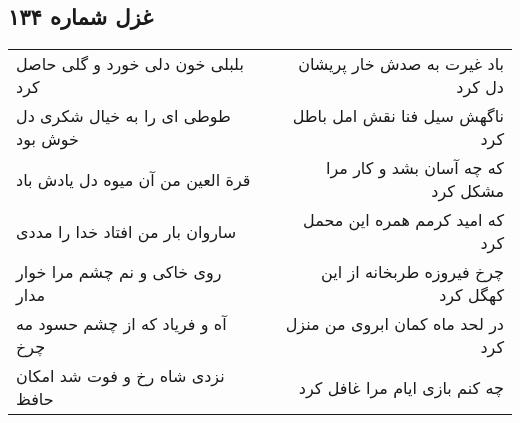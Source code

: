 \begin{center}
\section*{غزل شماره ۱۳۴}
\label{sec:sh134}
\begin{longtable}{l p{0.5cm} r}
بلبلی خون دلی خورد و گلی حاصل کرد
&&
باد غیرت به صدش خار پریشان دل کرد
\\
طوطی ای را به خیال شکری دل خوش بود
&&
ناگهش سیل فنا نقش امل باطل کرد
\\
قرة العین من آن میوه دل یادش باد
&&
که چه آسان بشد و کار مرا مشکل کرد
\\
ساروان بار من افتاد خدا را مددی
&&
که امید کرمم همره این محمل کرد
\\
روی خاکی و نم چشم مرا خوار مدار
&&
چرخ فیروزه طربخانه از این کهگل کرد
\\
آه و فریاد که از چشم حسود مه چرخ
&&
در لحد ماه کمان ابروی من منزل کرد
\\
نزدی شاه رخ و فوت شد امکان حافظ
&&
چه کنم بازی ایام مرا غافل کرد
\\
\end{longtable}
\end{center}

